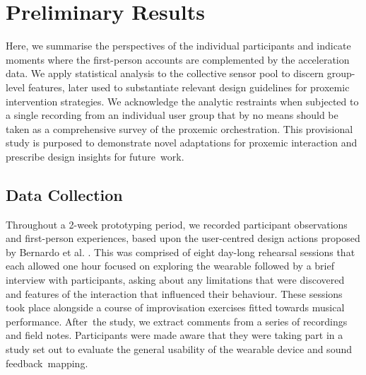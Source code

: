 
\section{Preliminary Results}
\label{sec:results}

Here, we summarise the perspectives of the individual participants and indicate moments where the first-person accounts are complemented by the acceleration data. We apply statistical analysis to the collective sensor pool to discern group-level features, later used to substantiate relevant design guidelines for proxemic intervention strategies. We acknowledge the analytic restraints when subjected to a single recording from an individual user group that by no means should be taken as a comprehensive survey of the proxemic orchestration. This provisional study is purposed to demonstrate novel adaptations for proxemic interaction and prescribe design insights for future~work.


\subsection*{Data Collection}
\label{sec:data_collection}

Throughout a 2-week prototyping period, we recorded participant observations and first-person experiences, based upon the user-centred design actions proposed by Bernardo et al. \cite{bernardo_user-centred_2018}. This was comprised of eight day-long rehearsal sessions that each allowed one hour focused on exploring the wearable followed by a brief interview with participants, asking about any limitations that were discovered and features of the interaction that influenced their behaviour. These sessions took place alongside a course of improvisation exercises fitted towards musical performance. After~the study, we extract comments from a series of recordings and field notes. Participants were made aware that they were taking part in a study set out to evaluate the general usability of the wearable device and sound feedback~mapping.

